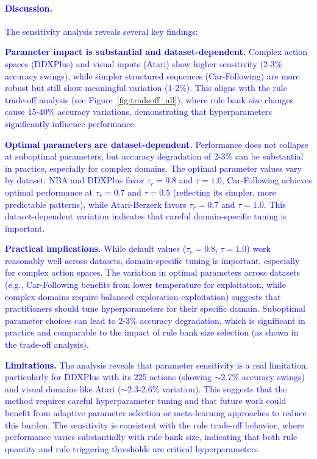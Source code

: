 \documentclass{article} %
\newcommand{\revise}[1]{\textcolor{blue}{#1}}
\begin{document}
\revise{\paragraph{Discussion.}
The sensitivity analysis reveals several key findings:}

\revise{\textbf{Parameter impact is substantial and dataset-dependent.} Complex action spaces (DDXPlus) and visual inputs (Atari) show higher sensitivity (2-3\% accuracy swings), while simpler structured sequences (Car-Following) are more robust but still show meaningful variation (1-2\%). This aligns with the rule trade-off analysis (see Figure~\ref{fig:tradeoff_all}), where rule bank size changes cause 15-40\% accuracy variations, demonstrating that hyperparameters significantly influence performance.}

\revise{\textbf{Optimal parameters are dataset-dependent.} Performance does not collapse at suboptimal parameters, but accuracy degradation of 2-3\% can be substantial in practice, especially for complex domains. The optimal parameter values vary by dataset: NBA and DDXPlus favor $\tau_r=0.8$ and $\tau=1.0$, Car-Following achieves optimal performance at $\tau_r=0.7$ and $\tau=0.5$ (reflecting its simpler, more predictable patterns), while Atari-Berzerk favors $\tau_r=0.7$ and $\tau=1.0$. This dataset-dependent variation indicates that careful domain-specific tuning is important.}

\revise{\textbf{Practical implications.} While default values ($\tau_r = 0.8$, $\tau = 1.0$) work reasonably well across datasets, domain-specific tuning is important, especially for complex action spaces. The variation in optimal parameters across datasets (e.g., Car-Following benefits from lower temperature for exploitation, while complex domains require balanced exploration-exploitation) suggests that practitioners should tune hyperparameters for their specific domain. Suboptimal parameter choices can lead to 2-3\% accuracy degradation, which is significant in practice and comparable to the impact of rule bank size selection (as shown in the trade-off analysis).}

\revise{\textbf{Limitations.} The analysis reveals that parameter sensitivity is a real limitation, particularly for DDXPlus with its 225 actions (showing $\sim$2.7\% accuracy swings) and visual domains like Atari ($\sim$2.3-2.6\% variation). This suggests that the method requires careful hyperparameter tuning and that future work could benefit from adaptive parameter selection or meta-learning approaches to reduce this burden. The sensitivity is consistent with the rule trade-off behavior, where performance varies substantially with rule bank size, indicating that both rule quantity and rule triggering thresholds are critical hyperparameters.}
\end{document}
